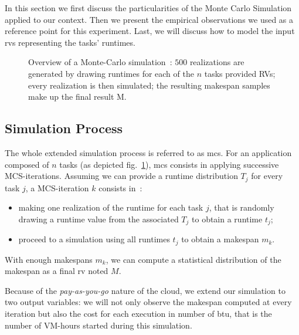 \documentclass[]{llncs}
\begin{document}
In  this  section we  first  discuss  the  particularities  of the  Monte  Carlo
Simulation applied to our context. Then we present the empirical observations we
used as a reference point for this experiment. Last, we will discuss how to
model the input \acp{rv} representing the tasks' runtimes.

\begin{figure}
	\centering
	\resizebox{0.6\textwidth}{!}{%
		
		}
\caption{Overview of a Monte-Carlo simulation~: $500$ realizations are generated
by drawing runtimes for each of the $n$ tasks provided RVs; every realization is
then simulated; the resulting makespan samples make up the final result M.}\label{fig:mc-process}
\end{figure}

\subsection{Simulation Process}


The whole extended simulation process is referred to as \ac{mcs}. 
For an application composed of $n$ tasks (as depicted fig.~\ref{fig:mc-process}),
\ac{mcs} consists in applying successive MCS-iterations. Assuming we can provide a
runtime distribution $T_j$ for every task $j$, a MCS-iteration $k$ consists in~:
\begin{itemize}
\item making one realization of the runtime  for each task $j$, that is randomly
  drawing a runtime value from the associated $T_j$ to obtain a runtime $t_j$;
\item proceed to a simulation using all runtimes $t_j$ to obtain a makespan $m_k$.
\end{itemize}
With enough makespans $m_k$, we can compute  a statistical distribution of
the makespan  as a final \ac{rv} noted $M$.

Because of the \emph{pay-as-you-go} nature of the cloud, we extend our simulation
to two output variables: we will not only observe the makespan computed at every
iteration but also the cost for each execution in number of \ac{btu}, that is the
number of VM-hours started during this simulation.
\end{document}

